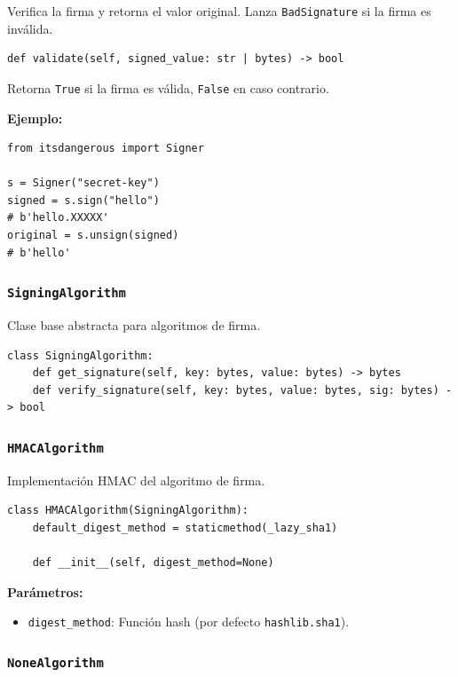 \documentclass[11pt,a4paper]{article}
\begin{document}
Verifica la firma y retorna el valor original. Lanza \texttt{BadSignature} si la firma es inválida.


\begin{lstlisting}
def validate(self, signed_value: str | bytes) -> bool
\end{lstlisting}


Retorna \texttt{True} si la firma es válida, \texttt{False} en caso contrario.


\textbf{Ejemplo:}


\begin{lstlisting}
from itsdangerous import Signer

s = Signer("secret-key")
signed = s.sign("hello")
# b'hello.XXXXX'
original = s.unsign(signed)
# b'hello'
\end{lstlisting}


\subsubsection*{\texttt{SigningAlgorithm}}


Clase base abstracta para algoritmos de firma.


\begin{lstlisting}
class SigningAlgorithm:
    def get_signature(self, key: bytes, value: bytes) -> bytes
    def verify_signature(self, key: bytes, value: bytes, sig: bytes) -> bool
\end{lstlisting}


\subsubsection*{\texttt{HMACAlgorithm}}


Implementación HMAC del algoritmo de firma.


\begin{lstlisting}
class HMACAlgorithm(SigningAlgorithm):
    default_digest_method = staticmethod(_lazy_sha1)
    
    def __init__(self, digest_method=None)
\end{lstlisting}


\textbf{Parámetros:}


\begin{itemize}[leftmargin=*,topsep=2pt,itemsep=1pt]
  \item \texttt{digest\_method}: Función hash (por defecto \texttt{hashlib.sha1}).
\end{itemize}


\subsubsection*{\texttt{NoneAlgorithm}}
\end{document}
